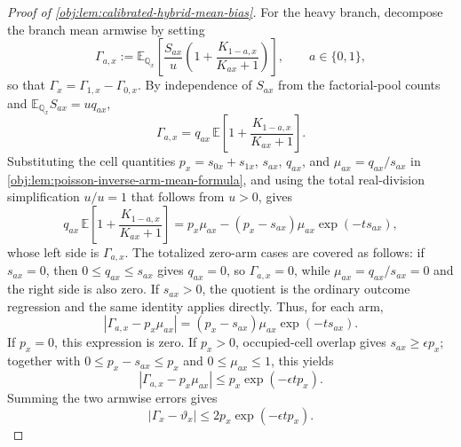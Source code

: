 \documentclass[11pt]{article}
\begin{document}
\begin{proof}[Proof of \cref{obj:lem:calibrated-hybrid-mean-bias}]
For the heavy branch, decompose the branch mean armwise by setting
\[
\Gamma_{a,x}
:=
\mathbb E_{\mathbb Q_x}\!\left[
\frac{S_{ax}}u\left(1+\frac{K_{1-a,x}}{K_{ax}+1}\right)
\right],
\qquad a\in\{0,1\},
\]
so that \(\Gamma_x=\Gamma_{1,x}-\Gamma_{0,x}\).  By independence of \(S_{ax}\) from the factorial-pool counts and \(\mathbb E_{\mathbb Q_x}S_{ax}=uq_{ax}\),
\[
\Gamma_{a,x}
=
q_{ax}\,
\mathbb E\!\left[1+\frac{K_{1-a,x}}{K_{ax}+1}\right].
\]
Substituting the cell quantities \(p_x=s_{0x}+s_{1x}\), \(s_{ax}\), \(q_{ax}\), and \(\mu_{ax}=q_{ax}/s_{ax}\) in \cref{obj:lem:poisson-inverse-arm-mean-formula}, and using the total real-division simplification \(u/u=1\) that follows from \(u>0\), gives
\[
q_{ax}\,
\mathbb E\!\left[1+\frac{K_{1-a,x}}{K_{ax}+1}\right]
=
p_x\mu_{ax}-(p_x-s_{ax})\mu_{ax}\exp(-ts_{ax}),
\]
whose left side is \(\Gamma_{a,x}\).
The totalized zero-arm cases are covered as follows: if \(s_{ax}=0\), then \(0\le q_{ax}\le s_{ax}\) gives \(q_{ax}=0\), so \(\Gamma_{a,x}=0\), while \(\mu_{ax}=q_{ax}/s_{ax}=0\) and the right side is also zero.  If \(s_{ax}>0\), the quotient is the ordinary outcome regression and the same identity applies directly.  Thus, for each arm,
\[
|\Gamma_{a,x}-p_x\mu_{ax}|
=
(p_x-s_{ax})\mu_{ax}\exp(-ts_{ax}).
\]
If \(p_x=0\), this expression is zero.  If \(p_x>0\), occupied-cell overlap gives \(s_{ax}\ge\epsilon p_x\); together with \(0\le p_x-s_{ax}\le p_x\) and \(0\le\mu_{ax}\le1\), this yields
\[
|\Gamma_{a,x}-p_x\mu_{ax}|
\le
p_x\exp(-\epsilon t p_x).
\]
Summing the two armwise errors gives
\[
|\Gamma_x-\vartheta_x|
\le
2p_x\exp(-\epsilon t p_x).
\]


\end{proof}
\end{document}
